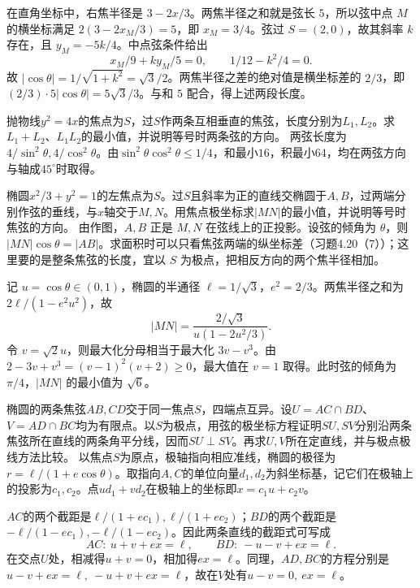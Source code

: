 在直角坐标中，右焦半径是 \(3-2x/3\)。两焦半径之和就是弦长 \(5\)，所以弦中点 \(M\) 的横坐标满足 \(2(3-2x_M/3)=5\)，即 \(x_M=3/4\)。弦过 \(S=(2,0)\)，故其斜率 \(k\) 存在，且 \(y_M=-5k/4\)。中点弦条件给出
\[
  x_M/9+ky_M/5=0,\qquad 1/12-k^2/4=0 .
\]
故 \(|\cos\theta|=1/\sqrt{1+k^2}=\sqrt3/2\)。两焦半径之差的绝对值是横坐标差的 \(2/3\)，即 \((2/3)\cdot5|\cos\theta|=5\sqrt3/3\)。与和 \(5\) 配合，得上述两段长度。


抛物线\(y^2=4x\)的焦点为\(S\)，过\(S\)作两条互相垂直的焦弦，长度分别为\(L_1,L_2\)。求\(L_1+L_2\)、\(L_1L_2\)的最小值，并说明等号时两条弦的方向。
\solutionanswer
两弦长度为\(4/\sin^2\theta,4/\cos^2\theta\)。由\(\sin^2\theta\cos^2\theta\le1/4\)，和最小\(16\)，积最小\(64\)，均在两弦方向与轴成\(45^\circ\)时取得。


椭圆\(x^2/3+y^2=1\)的左焦点为\(S\)。过\(S\)且斜率为正的直线交椭圆于\(A,B\)，过两端分别作弦的垂线，与\(x\)轴交于\(M,N\)。用焦点极坐标求\(|MN|\)的最小值，并说明等号时焦弦的方向。
\solutionanswer
由作图，\(A,B\) 正是 \(M,N\) 在弦线上的正投影。设弦的倾角为 \(\theta\)，则 \(|MN|\cos\theta=|AB|\)。求面积时可以只看焦弦两端的纵坐标差（习题4.20（7））；这里要的是整条焦弦的长度，宜以 \(S\) 为极点，把相反方向的两个焦半径相加。

记 \(u=\cos\theta\in(0,1)\)，椭圆的半通径 \(\ell=1/\sqrt3\)，\(e^2=2/3\)。两焦半径之和为 \(2\ell/(1-e^2u^2)\)，故
\[
 |MN|=\frac{2/\sqrt3}{u(1-2u^2/3)}.
\]
令 \(v=\sqrt2u\)，则最大化分母相当于最大化 \(3v-v^3\)。由 \(2-3v+v^3=(v-1)^2(v+2)\ge0\)，最大值在 \(v=1\) 取得。此时弦的倾角为 \(\pi/4\)，\(|MN|\) 的最小值为 \(\sqrt6\)。


椭圆的两条焦弦\(AB,CD\)交于同一焦点\(S\)，四端点互异。设\(U=AC\cap BD\)、\(V=AD\cap BC\)均为有限点。以\(S\)为极点，用弦的极坐标方程证明\(SU,SV\)分别沿两条焦弦所在直线的两条角平分线，因而\(SU\perp SV\)。再求\(U,V\)所在定直线，并与极点极线方法比较。
\solutionanswer
以焦点\(S\)为原点，极轴指向相应准线，椭圆的极径为\(r=\ell/(1+e\cos\theta)\)。取指向\(A,C\)的单位向量\(d_1,d_2\)为斜坐标基，记它们在极轴上的投影为\(c_1,c_2\)。点\(ud_1+vd_2\)在极轴上的坐标即\(x=c_1u+c_2v\)。

\(AC\)的两个截距是\(\ell/(1+ec_1),\ell/(1+ec_2)\)；\(BD\)的两个截距是\(-\ell/(1-ec_1),-\ell/(1-ec_2)\)。因此两条直线的截距式可写成
\[
 AC:\ u+v+ex=\ell,\qquad BD:\ -u-v+ex=\ell.
\]
在交点\(U\)处，相减得\(u+v=0\)，相加得\(ex=\ell\)。同理，\(AD,BC\)的方程分别是\(u-v+ex=\ell,\ -u+v+ex=\ell\)，故在\(V\)处有\(u-v=0,\ ex=\ell\)。

